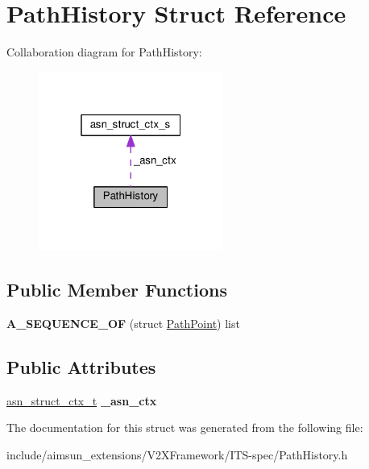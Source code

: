 \hypertarget{structPathHistory}{}\section{Path\+History Struct Reference}
\label{structPathHistory}


Collaboration diagram for Path\+History\+:\nopagebreak
\begin{figure}[H]
\begin{center}
\leavevmode
\includegraphics[width=172pt]{structPathHistory__coll__graph}
\end{center}
\end{figure}
\subsection*{Public Member Functions}
\begin{DoxyCompactItemize}
\item 
{\bfseries A\+\_\+\+S\+E\+Q\+U\+E\+N\+C\+E\+\_\+\+OF} (struct \hyperlink{structPathPoint}{Path\+Point}) list\hypertarget{structPathHistory_a748ef250133fb700c116dfa71eb6ff1c}{}\label{structPathHistory_a748ef250133fb700c116dfa71eb6ff1c}

\end{DoxyCompactItemize}
\subsection*{Public Attributes}
\begin{DoxyCompactItemize}
\item 
\hyperlink{structasn__struct__ctx__s}{asn\+\_\+struct\+\_\+ctx\+\_\+t} {\bfseries \+\_\+asn\+\_\+ctx}\hypertarget{structPathHistory_ae734a5bffbe7de5e1425308655bc1bcb}{}\label{structPathHistory_ae734a5bffbe7de5e1425308655bc1bcb}

\end{DoxyCompactItemize}


The documentation for this struct was generated from the following file\+:\begin{DoxyCompactItemize}
\item 
include/aimsun\+\_\+extensions/\+V2\+X\+Framework/\+I\+T\+S-\/spec/Path\+History.\+h\end{DoxyCompactItemize}
